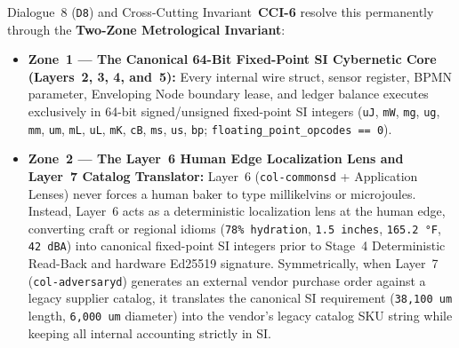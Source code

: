 Dialogue~8 (\texttt{D8}) and Cross-Cutting Invariant~\textbf{CCI-6} resolve this permanently through the \textbf{Two-Zone Metrological Invariant}:
\begin{itemize}
    \item \textbf{Zone~1 --- The Canonical 64-Bit Fixed-Point SI Cybernetic Core (Layers~2, 3, 4, and~5):} Every internal wire struct, sensor register, BPMN parameter, Enveloping Node boundary lease, and ledger balance executes exclusively in 64-bit signed/unsigned fixed-point SI integers (\texttt{uJ}, \texttt{mW}, \texttt{mg}, \texttt{ug}, \texttt{mm}, \texttt{um}, \texttt{mL}, \texttt{uL}, \texttt{mK}, \texttt{cB}, \texttt{ms}, \texttt{us}, \texttt{bp}; \texttt{floating\_point\_opcodes == 0}).
    \item \textbf{Zone~2 --- The Layer~6 Human Edge Localization Lens and Layer~7 Catalog Translator:} Layer~6 (\texttt{col-commonsd} + Application Lenses) never forces a human baker to type millikelvins or microjoules. Instead, Layer~6 acts as a deterministic localization lens at the human edge, converting craft or regional idioms (\texttt{78\% hydration}, \texttt{1.5 inches}, \texttt{165.2 °F}, \texttt{42 dBA}) into canonical fixed-point SI integers prior to Stage~4 Deterministic Read-Back and hardware Ed25519 signature. Symmetrically, when Layer~7 (\texttt{col-adversaryd}) generates an external vendor purchase order against a legacy supplier catalog, it translates the canonical SI requirement (\texttt{38,100 um} length, \texttt{6,000 um} diameter) into the vendor's legacy catalog SKU string while keeping all internal accounting strictly in SI.
\end{itemize}

